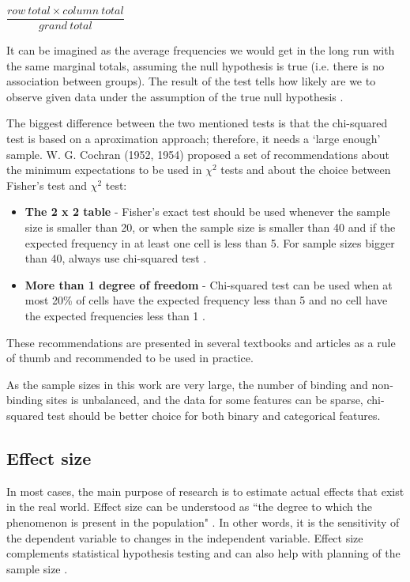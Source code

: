 \vspace{2mm}
\begin{center}
$\dfrac{row\: total\times column\:total}{grand\:total}$
\end{center}

It can be imagined as the average frequencies we would get in the long run with the same marginal totals, assuming the null hypothesis is true (i.e. there is no association between groups). The result of the test tells how likely are we to observe given data under the assumption of the true null hypothesis \cite{bland}.

The biggest difference between the two mentioned tests is that the chi-squared test is based on a aproximation approach; therefore, it needs a `large enough' sample. W. G. Cochran (1952, 1954) proposed a set of recommendations about the minimum expectations to be used in $\chi^{2}$ tests and about the choice between Fisher's test and $\chi^{2}$ test:

\begin{itemize}
\item \textbf{The 2 x 2 table} - Fisher's exact test should be used whenever the sample size is smaller than 20, or when the sample size is smaller than 40 and if the expected frequency in at least one cell is less than 5. For sample sizes bigger than 40, always use chi-squared test \cite{cochran1952, cochran1954}.
\item \textbf{More than 1 degree of freedom} - Chi-squared test can be used when at most 20\% of cells have the expected frequency less than 5 and no cell have the expected frequencies less than 1 \cite{cochran1954}.
\end{itemize}

 These recommendations are presented in several textbooks and articles as a rule of thumb \cite{cochranRule} and recommended to be used in practice.

As the sample sizes in this work are very large, the number of binding and non-binding sites is unbalanced, and the data for some features can be sparse, chi-squared test should be better choice for both binary and categorical features.

\subsection{Effect size} \label{s:effectsize}
In most cases, the main purpose of research is to estimate actual effects that exist in the real world. Effect size can be understood as ``the degree to which the phenomenon is present in the population" \cite{cohen_book}. In other words, it is the sensitivity of the dependent variable to changes in the independent variable. Effect size complements statistical hypothesis testing and can also help with planning of the sample size \cite{cohen}.

